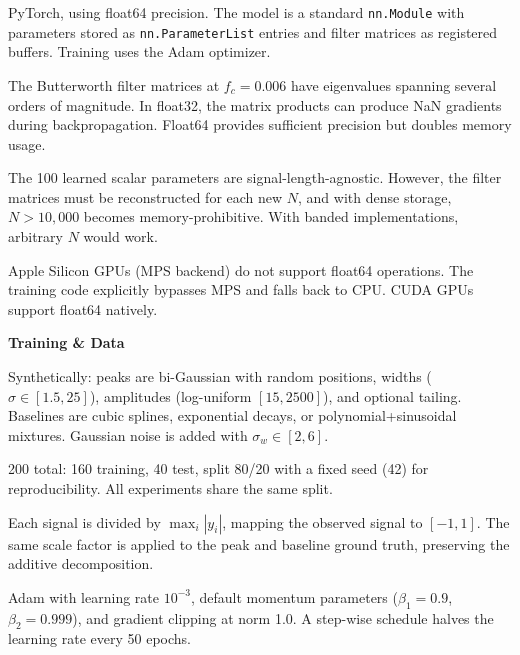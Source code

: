 \documentclass[11pt, letterpaper]{article}
\begin{document}
{PyTorch, using float64 precision.  The model is a standard \texttt{nn.Module} with parameters stored as \texttt{nn.ParameterList} entries and filter matrices as registered buffers.  Training uses the Adam optimizer.}

{The Butterworth filter matrices at $f_c = 0.006$ have eigenvalues spanning several orders of magnitude.  In float32, the matrix products can produce NaN gradients during backpropagation.  Float64 provides sufficient precision but doubles memory usage.}

{The 100 learned scalar parameters are signal-length-agnostic.  However, the filter matrices must be reconstructed for each new $N$, and with dense storage, $N > 10{,}000$ becomes memory-prohibitive.  With banded implementations, arbitrary $N$ would work.}

{Apple Silicon GPUs (MPS backend) do not support float64 operations.  The training code explicitly bypasses MPS and falls back to CPU.  CUDA GPUs support float64 natively.}


\vspace{0.8em}
{\large\bfseries\sffamily\color{SectionBlue} Training \& Data}\par\vspace{0.2em}

{Synthetically: peaks are bi-Gaussian with random positions, widths ($\sigma \in [1.5, 25]$), amplitudes (log-uniform $[15, 2500]$), and optional tailing.  Baselines are cubic splines, exponential decays, or polynomial+sinusoidal mixtures.  Gaussian noise is added with $\sigma_w \in [2, 6]$.}

{200 total: 160 training, 40 test, split 80/20 with a fixed seed (42) for reproducibility.  All experiments share the same split.}

{Each signal is divided by $\max_i |y_i|$, mapping the observed signal to $[-1, 1]$.  The same scale factor is applied to the peak and baseline ground truth, preserving the additive decomposition.}

{Adam with learning rate $10^{-3}$, default momentum parameters ($\beta_1 = 0.9$, $\beta_2 = 0.999$), and gradient clipping at norm 1.0.  A step-wise schedule halves the learning rate every 50 epochs.}
\end{document}
